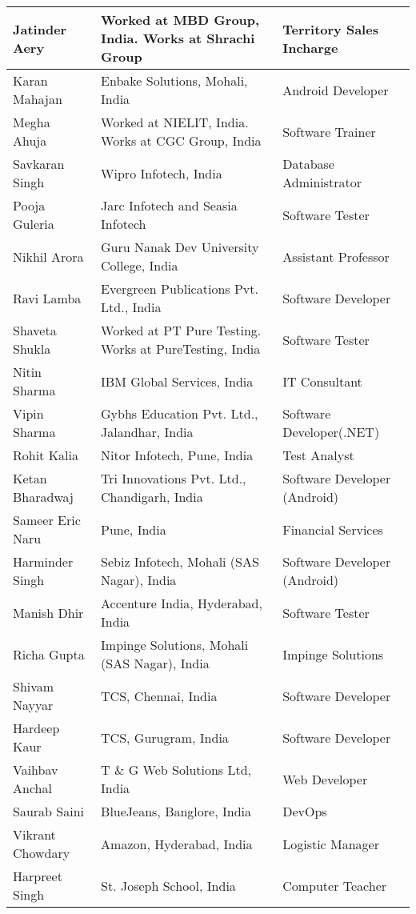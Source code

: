 \documentclass[margin,line]{res}
\begin{document}
\begin{resume}
\begin{center}
\begin{tabular}{ | p{3.5cm} | p{5.70cm} | l | }
    \hline    
    Jatinder Aery & Worked at MBD Group, India. Works at Shrachi Group & Territory Sales Incharge\\
    \hline    
    Karan Mahajan & Enbake Solutions, Mohali, India & Android Developer\\
    \hline
    Megha Ahuja & Worked at NIELIT, India. Works at CGC Group, India & Software Trainer\\
    \hline
    Savkaran Singh & Wipro Infotech, India & Database Administrator\\
    \hline
    Pooja Guleria & Jarc Infotech and Seasia Infotech & Software Tester\\
    \hline
    Nikhil Arora & Guru Nanak Dev University College, India & Assistant Professor\\
    \hline
    Ravi Lamba & Evergreen Publications Pvt. Ltd., India & Software Developer\\
    \hline
    Shaveta Shukla & Worked at PT Pure Testing. Works at PureTesting, India & Software Tester\\
    \hline 
    Nitin Sharma & IBM Global Services, India & IT Consultant\\
    \hline
    Vipin Sharma & Gybhs Education Pvt. Ltd., Jalandhar, India & Software Developer(.NET)\\
    \hline
    Rohit Kalia & Nitor Infotech, Pune, India & Test Analyst\\
    \hline
    Ketan Bharadwaj & Tri Innovations Pvt. Ltd., Chandigarh, India & Software Developer (Android)\\
    \hline
    Sameer Eric Naru & Pune, India & Financial Services\\
    \hline
    Harminder Singh & Sebiz Infotech, Mohali (SAS Nagar), India & Software Developer (Android)\\
    \hline
    Manish Dhir & Accenture India, Hyderabad, India & Software Tester\\
    \hline
    Richa Gupta & Impinge Solutions,  Mohali (SAS Nagar), India & Impinge Solutions\\
    \hline
    Shivam Nayyar & TCS, Chennai, India & Software Developer\\
    \hline
	Hardeep Kaur & TCS, Gurugram, India & Software Developer\\
	\hline
	Vaihbav Anchal & T \& G Web Solutions Ltd, India & Web Developer\\
	\hline
	Saurab Saini & BlueJeans, Banglore, India & DevOps\\
	\hline
	Vikrant Chowdary & Amazon, Hyderabad, India & Logistic Manager\\
	\hline
	Harpreet Singh & St. Joseph School, India & Computer Teacher\\
	\hline    
	\end{tabular}

\end{center}

\end{resume}
\end{document}
